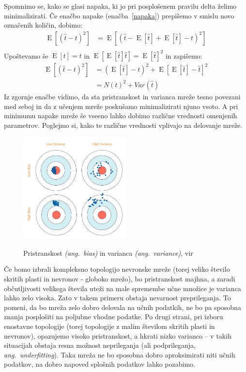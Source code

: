 \documentclass[mat1]{fmfdelo}
\begin{document}
Spomnimo se, kako se glasi napaka, ki jo pri posplošenem pravilu delta želimo minimalizirati. Če enačbo napake (enačba~\eqref{napaka}) prepišemo v smislu novo označenih količin, dobimo:
%
\begin{equation}
\begin{aligned}
\operatorname{E}[(\hat{t}-t)^2] &= \operatorname{E}[(\hat{t} -\operatorname{E}[\hat{t}] + \operatorname{E}[\hat{t}] - t)^2]  \\
\end{aligned}
\end{equation}
Upoštevamo še $\operatorname{E}[t] = t$ in $\operatorname{E}[\operatorname{E}[\hat{t}]\hat{t}] = \operatorname{E}[\hat{t}]^2$ in zapišemo:
\begin{equation}
\begin{aligned}
\operatorname{E}[(\hat{t}-t)^2] &= (\operatorname{E}[\hat{t}] - t)^2 +\operatorname{E}[\operatorname{E}[\hat{t}] -\hat{t}]^2\\
&= N(t)^2 + Var(\hat{t})
\end{aligned}
\end{equation}
%
Iz zgornje enačbe vidimo, da sta pristranskost in varianca mreže tesno povezani med seboj in da z učenjem mreže poskušamo minimalizirati njuno vsoto. A pri minimumu napake mreže še vseeno lahko dobimo različne vrednosti omenjenih parametrov. Poglejmo si, kako te različne vrednosti vplivajo na delovanje mreže.
%
\begin{figure}[!ht]
  \centering
    \includegraphics[width=0.5\textwidth]{bias.jpg}
  \label{fig:bis}
 \caption{Pristranskost \emph{(ang.~bias)} in varianca \emph{(ang.~variance)}, vir~\cite{bias}}
\end{figure}
%

Če bomo izbrali kompleksno topologijo nevronske mreže (torej veliko število skritih plasti in nevronov - globoko mrežo), bo pristranskost majhna, a zaradi občutljivosti velikega števila uteži na male spremembe učne množice je varianca lahko zelo visoka. Zato v takem primeru obstaja nevarnost preprileganja. To pomeni, da bo mreža zelo dobro delovala na učnih podatkih, ne bo pa sposobna znanja posplošiti na poljubne vhodne podatke.
Po drugi strani, pri izboru enostavne topologije (torej topologije z malim številom skritih plasti in nevronov), opazujemo visoko pristranskost, a hkrati nizko varianco -- v takih situacijah obstaja resna možnost neprileganja (ali podprileganja, \emph{ang.~underfitting}). Taka mreža ne bo sposobna dobro aproksimirati niti učnih podatkov, na dobro napoved splošnih podatkov lahko pozabimo.
\end{document}
